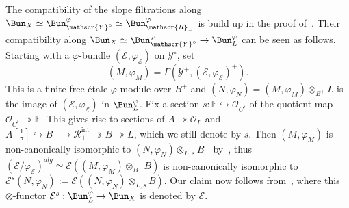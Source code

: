 The compatibility of the slope filtrations along $\Bun_{X}\simeq\Bun_{\mathscr{Y}^{\circ}}^{\varphi}\simeq\Bun_{\mathscr{R}_{-}}^{\varphi}$ is build up in the proof of~\cite[11.2.22]{FaFo15}. Their compatibility along $\Bun_{X}\simeq\Bun_{\mathscr{Y}^{\circ}}^{\varphi}\rightarrow\Bun_{L}^{\varphi}$ can be seen as follows. Starting with a $\varphi$-bundle $(\mathscr{E},\varphi_{\mathscr{E}})$ on $\mathscr{Y}^{\circ}$, set
\[
(M,\varphi_{M})=\Gamma\left(\mathscr{Y}^{+},(\mathscr{E},\varphi_{\mathscr{E}})^{+}\right).
\]
This is a finite free \'etale $\varphi$-module over $B^{+}$ and $(N,\varphi_{N})=(M,\varphi_{M})\otimes_{B^{+}}L$ is the image of $(\mathscr{E},\varphi_{\mathscr{E}})$ in $\Bun_{L}^{\varphi}$. Fix a section $s:\mathbb{F}\hookrightarrow\mathcal{O}_{C^{\flat}}$ of the quotient map $\mathcal{O}_{C^{\flat}}\twoheadrightarrow\mathbb{F}$. This gives rise to sections of $A\twoheadrightarrow\mathcal{O}_{L}$ and $A[\frac{1}{\pi}]\hookrightarrow B^{+}\rightarrow\mathscr{R}_{+}^{\mathrm{int}}\twoheadrightarrow\overline{B}\twoheadrightarrow L$, which we still denote by $s$. Then $(M,\varphi_{M})$ is non-canonically isomorphic to $(N,\varphi_{N})\otimes_{L,s}B^{+}$ by~\cite[\S 11.1]{FaFo15}, thus $(\mathscr{E}/\varphi_{\mathscr{E}})^{alg}\simeq\mathcal{E}((M,\varphi_{M})\otimes_{B^{+}}B)$ is non-canonically isomorphic to $\mathcal{E}^{s}(N,\varphi_{N}):=\mathcal{E}((N,\varphi_{N})\otimes_{L,s}B)$. Our claim now follows from~\cite[\S 8.2.4]{FaFo15}, where this $\otimes$-functor $\mathcal{E}^{s}:\Bun_{L}^{\varphi}\rightarrow\Bun_{X}$ is denoted by $\mathcal{E}$.


